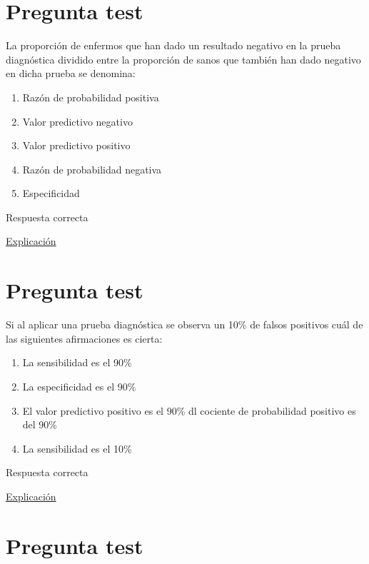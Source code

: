 \documentclass[
]{book}
\providecommand{\tightlist}{%
  \setlength{\itemsep}{0pt}\setlength{\parskip}{0pt}}
\begin{document}
\hypertarget{pregunta-test-86}{%
\section{Pregunta test}\label{pregunta-test-86}}

La proporción de enfermos que han dado un resultado negativo en la prueba diagnóstica dividido entre la proporción de sanos que también han dado negativo en dicha prueba se denomina:

\begin{enumerate}
\def\labelenumi{\alph{enumi})}
\tightlist
\item
  Razón de probabilidad positiva
\item
  Valor predictivo negativo
\item
  Valor predictivo positivo
\item
  Razón de probabilidad negativa
\item
  Especificidad
\end{enumerate}

Respuesta correcta

\href{https://www.redalyc.org/journal/3555/355568264003/html/}{Explicación}

\hypertarget{pregunta-test-87}{%
\section{Pregunta test}\label{pregunta-test-87}}

Si al aplicar una prueba diagnóstica se observa un 10\% de falsos positivos cuál de las siguientes afirmaciones es cierta:

\begin{enumerate}
\def\labelenumi{\alph{enumi})}
\tightlist
\item
  La sensibilidad es el 90\%
\item
  La especificidad es el 90\%
\item
  El valor predictivo positivo es el 90\%
  dl cociente de probabilidad positivo es del 90\%
\item
  La sensibilidad es el 10\%
\end{enumerate}

Respuesta correcta

\href{https://1fjmanzano.github.io/bioestadistica/relaci\%C3\%B3n-entre-variables-cualitativas.html\#diagno\%CC\%81stico-cli\%CC\%81nico}{Explicación}

\hypertarget{pregunta-test-88}{%
\section{Pregunta test}\label{pregunta-test-88}}
\end{document}
